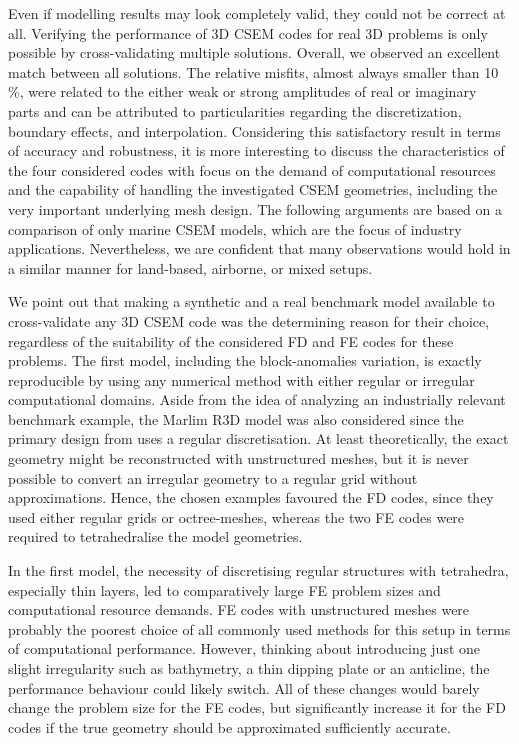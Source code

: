 \documentclass[
    paper,
  ]{geophysics}
\begin{document}
Even if modelling results may look completely valid, they could not be correct
at all. Verifying the performance of 3D CSEM codes for real 3D problems is only
possible by cross-validating multiple solutions. Overall, we observed an
excellent match between all solutions. The relative misfits, almost always
smaller than 10\,\%, were related to the either weak or strong amplitudes of
real or imaginary parts and can be attributed to particularities regarding the
discretization, boundary effects, and interpolation. Considering this
satisfactory result in terms of accuracy and robustness, it is more interesting
to discuss the characteristics of the four considered codes with focus on the
demand of computational resources and the capability of handling the
investigated CSEM geometries, including the very important underlying mesh
design. The following arguments are based on a comparison of only marine CSEM
models, which are the focus of industry applications. Nevertheless, we are
confident that many observations would hold in a similar manner for land-based,
airborne, or mixed setups.

We point out that making a synthetic and a real benchmark model available to
cross-validate any 3D CSEM code was the determining reason for their choice,
regardless of the suitability of the considered FD and FE codes for these
problems. The first model, including the block-anomalies variation, is exactly
reproducible by using any numerical method with either regular or irregular
computational domains. Aside from the idea of analyzing an industrially
relevant benchmark example, the Marlim R3D model was also considered since the
primary design from \cite{GEO.19.Correa} uses a regular discretisation. At
least theoretically, the exact geometry might be reconstructed with
unstructured meshes, but it is never possible to convert an irregular geometry
to a regular grid without approximations. Hence, the chosen examples favoured
the FD codes, since they used either regular grids or
octree-meshes, whereas the two FE codes were required to
tetrahedralise the model geometries.

In the first model, the necessity of discretising regular structures with
tetrahedra, especially thin layers, led to comparatively large FE problem sizes
and computational resource demands. FE codes with unstructured meshes were
probably the poorest choice of all commonly used methods for this setup in
terms of computational performance. However, thinking about introducing just
one slight irregularity such as bathymetry, a thin dipping plate or an
anticline, the performance behaviour could likely switch. All of these changes
would barely change the problem size for the FE codes, but significantly
increase it for the FD codes if the true geometry should be approximated
sufficiently accurate.
\end{document}
